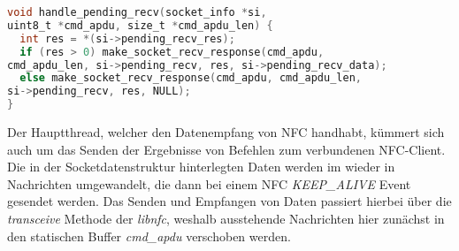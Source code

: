 	    \begin{lstlisting}[frame=bt, label={lst:nfc:recvPending}, language=C, caption=Senden von Daten über NFC (Servercode in C) \cite{nfcSocketsServer}]
void handle_pending_recv(socket_info *si,
uint8_t *cmd_apdu, size_t *cmd_apdu_len) {
  int res = *(si->pending_recv_res);
  if (res > 0) make_socket_recv_response(cmd_apdu,
cmd_apdu_len, si->pending_recv, res, si->pending_recv_data);
  else make_socket_recv_response(cmd_apdu, cmd_apdu_len,
si->pending_recv, res, NULL);
}
        \end{lstlisting}
	    Der Hauptthread, welcher den Datenempfang von NFC handhabt, kümmert sich auch um das Senden der Ergebnisse von Befehlen zum verbundenen NFC-Client. Die in der Socketdatenstruktur hinterlegten Daten werden im  wieder in Nachrichten umgewandelt, die dann bei einem NFC {\it KEEP\_ALIVE} Event gesendet werden. Das Senden und Empfangen von Daten passiert hierbei über die {\it transceive} Methode der {\it libnfc}, weshalb ausstehende Nachrichten hier zunächst in den statischen Buffer {\it cmd\_apdu} verschoben werden.
	    
